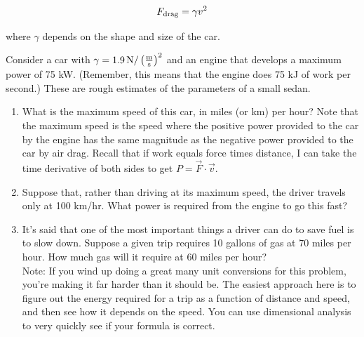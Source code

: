 \documentclass[12pt]{article}
\begin{document}
\begin{enumerate}
{      \begin{equation*}
        F_{\rm {drag}} = \gamma v^2
      \end{equation*}

      where $\gamma$ depends on the shape and size of the car. 

      Consider a car with $\gamma = 1.9 \, \rm N / \left(\frac{\rm m}{\rm s}\right)^2$ and an engine that develops a maximum power of 75 kW. (Remember, this means that the engine does 75 kJ of work per second.) These are rough estimates of the parameters of a small sedan.


      \begin{enumerate}
        \item{What is the maximum speed of this car, in miles (or km) per hour? Note that the maximum speed is
the speed where the positive power provided to the car by the engine has the same magnitude as the negative power
provided to the car by air drag. Recall that if work equals force times distance, I can take the time derivative 
of both sides to get $P=\vec F \cdot \vec v$.}
        \item{Suppose that, rather than driving at its maximum speed, the driver travels only at 100 km/hr. What power is required from the engine to go this fast?}
        \item{It's said that one of the most important things a driver can do to save fuel is to slow down. Suppose a given trip requires 10 gallons of gas at 70 miles per hour. How much gas will it require at 60 miles per hour?\\
          {\sc Note:} If you wind up doing a great many unit conversions for this problem, you're making it far harder than it should be. The easiest approach here is to figure out the energy required for a trip as a function of distance and speed,
        and then see how it depends on the speed. You can use dimensional analysis to very quickly see if your formula is correct.}
    \end{enumerate}
  }




    \end{enumerate}
\end{document}
